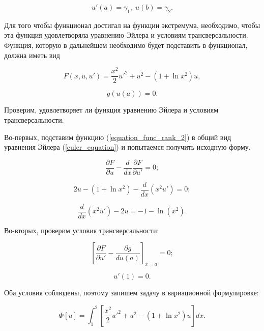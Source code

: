 \documentclass{article}
\begin{document}
\begin{displaymath}
	u'(a) = \gamma_{1}, \; u(b) = \gamma_{2}.
\end{displaymath}

Для того чтобы функционал достигал на функции экстремума, необходимо, чтобы эта функция удовлетворяла уравнению Эйлера и условиям трансверсальности. Функция, которую в дальнейшем необходимо будет подставить в функционал, должна иметь вид

\begin{equation}\label{equation_func_rank_2}
	F(x, u, u') = \frac{x^2}{2}u'^2 + u^2 - (1+\ln{x^2})u,
\end{equation}

\begin{displaymath}
	g(u(a)) = 0.
\end{displaymath}

\noindent Проверим, удовлетворяет ли функция уравнению Эйлера и условиям трансверсальности. 

Во-первых, подставим функцию (\ref{equation_func_rank_2}) в общий вид уравнения Эйлера (\ref{euler_equation}) и попытаемся получить исходную форму.

\begin{displaymath}
	\frac{\partial F}{\partial u} - \frac{d}{dx}\frac{\partial F}{\partial u'} = 0;
\end{displaymath}

\begin{displaymath}
	2u - (1 + \ln{x^2}) - \frac{d}{dx}(x^2 u') = 0;
\end{displaymath}

\begin{displaymath}
	\frac{d}{dx}(x^2 u') - 2u = -1 - \ln(x^2).
\end{displaymath}

\noindent Во-вторых, проверим условия трансверсальности:

\begin{displaymath}
	\left[ \frac{\partial F}{\partial u'} - \frac{\partial g}{du(a)} \right]_{x=a} = 0;
\end{displaymath}

\begin{displaymath}
	u'(1) = 0.
\end{displaymath}

\noindent Оба условия соблюдены, поэтому запишем задачу в вариационной формулировке:

\begin{equation}\label{equation_functional_rank_2}
	\Phi[u] = \int_{1}^{2} \left[ \frac{x^2}{2}u'^2 + u^2 - (1 + \ln{x^2})u \right] dx.
\end{equation}
\end{document}
